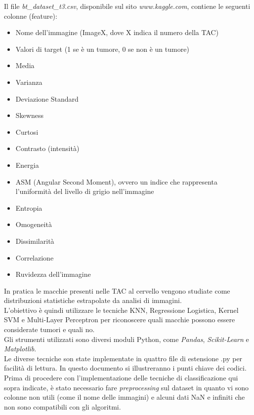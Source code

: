 Il file \textit{bt\_dataset\_t3.csv}, disponibile sul sito \textit{www.kaggle.com}, contiene le seguenti colonne (feature):
\begin{itemize}
	\item Nome dell'immagine (ImageX, dove X indica il numero della TAC)
	\item Valori di target (1 se è un tumore, 0 se non è un tumore)
	\item Media
	\item Varianza
	\item Deviazione Standard
	\item Skewness
	\item Curtosi
	\item Contrasto (intensità)
	\item Energia
	\item ASM (Angular Second Moment), ovvero un indice che rappresenta l'uniformità del livello di grigio nell'immagine
	\item Entropia
	\item Omogeneità
	\item Dissimilarità
	\item Correlazione
	\item Ruvidezza dell'immagine
\end{itemize}
In pratica le macchie presenti nelle TAC al cervello vengono studiate come distribuzioni statistiche estrapolate da analisi di immagini.\\
L'obiettivo è quindi utilizzare le tecniche KNN, Regressione Logistica, Kernel SVM e Multi-Layer Perceptron per riconoscere quali macchie possono essere considerate tumori e quali no.\\
Gli strumenti utilizzati sono diversi moduli Python, come \textit{Pandas}, \textit{Scikit-Learn} e \textit{Matplotlib}.\\
Le diverse tecniche son state implementate in quattro file di estensione .py per facilità di lettura. In questo documento si illustreranno i punti chiave dei codici.\\
Prima di procedere con l'implementazione delle tecniche di classificazione qui sopra indicate, è stato necessario fare \textit{preprocessing} sul dataset in quanto vi sono colonne non utili (come il nome delle immagini) e alcuni dati NaN e infiniti che non sono compatibili con gli algoritmi.